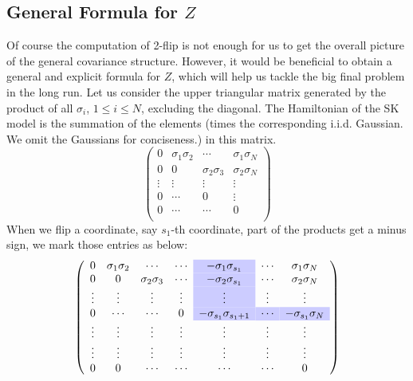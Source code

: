 \documentclass[10pt]{article}
\newcommand\y{\cellcolor{blue!20}}
\newenvironment{Proof of lemma}{\noindent{\bf Proof of Lemma}}{\hfill$\Box$\newline}
\newenvironment{Proof of claim}{\noindent{\bf Proof of claim}}{\hfill$\Box$\newline}
\newenvironment{Proof of theorem}{\noindent{\bf Proof of Theorem}}{\hfill\scriptsize{$\Box$}\newline}
\newenvironment{Proof of theorems}{\noindent{\bf Proof of Theorems}}{\hfill$\Box$\newline}
\newenvironment{Proof of proposition}{\noindent{\bf Proof of Proposition}}{\hfill$\Box$\newline}
\newenvironment{Proof of propositions}{\noindent{\bf Proof of Propositions}}{\hfill$\Box$\newline}
\newenvironment{Proof of exercise}{\noindent{\it Proof of Exercise:}}{\hfill$\Box$}
\numberwithin{equation}{section}
\begin{document}
\subsection{General Formula for $Z$}
Of course the computation of 2-flip is not enough for us to get the overall picture of the general covariance structure. However, it would be beneficial to obtain a general and explicit formula for $Z$, which will help us tackle the big final problem in the long run.
Let us consider the upper triangular matrix generated by the product of all $\sigma_i$, $1 \leq i \leq N$, excluding the diagonal. The Hamiltonian of the SK model is the summation of the elements (times the corresponding i.i.d. Gaussian. We omit the Gaussians for conciseness.) in this matrix.
\begin{equation}
    \left(\begin{array}{cccc}
      0  & \sigma_1 \sigma_2  & \cdots & \sigma_1 \sigma_N \\
      0  & 0  & \sigma_2 \sigma_3 & \sigma_2 \sigma_N \\
      \vdots  & \vdots   & \vdots & \vdots \\
      0  & \cdots   & 0  & \vdots \\
      0  &  \cdots  & \cdots &  0\\
    \end{array}\right)
\end{equation}
When we flip a coordinate, say $s_1$-th coordinate, part of the products get a minus sign, we mark those entries as below:
\begin{equation}
    \left(\begin{array}{ccccccc}
      0     &\sigma_1 \sigma_2  &\cdots            &\cdots &\y -\sigma_1 \sigma_{s_1}       & \cdots   & \sigma_1 \sigma_N \\
      0     &0                  &\sigma_2 \sigma_3 &\cdots &\y -\sigma_2 \sigma_{s_1} & \cdots & \sigma_2 \sigma_N \\
      \vdots&\vdots             &\vdots            &\vdots &\y \vdots               & \vdots & \vdots\\
      0     &\cdots             &\cdots            &0      &\y -\sigma_{s_1} \sigma_{s_1+1}& \y \cdots & \y -\sigma_{s_1} \sigma_{N} \\
      \vdots&\vdots             &\vdots            &\vdots & \vdots & \vdots & \vdots\\
      \vdots&\vdots             &\vdots            &\vdots & \vdots & \vdots & \vdots\\
      0     & 0                 &\cdots            &\cdots & \cdots & \cdots &  0\\
    \end{array}\right)
\end{equation}
\end{document}
